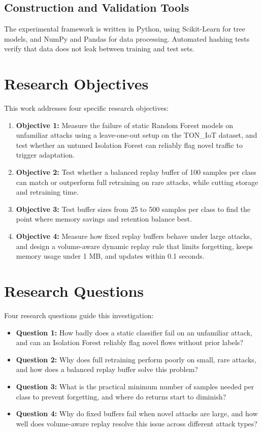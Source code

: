 \subsection{Construction and Validation Tools}
\label{subsec:construction_validation_tools}
The experimental framework is written in Python, using Scikit-Learn for tree models, and NumPy and Pandas for data processing. Automated hashing tests verify that data does not leak between training and test sets.

\section{Research Objectives}
\label{sec:research_objectives}

This work addresses four specific research objectives:

\begin{enumerate}
    \item \textbf{Objective 1:} Measure the failure of static Random Forest models on unfamiliar attacks using a leave-one-out setup on the TON\_IoT dataset, and test whether an untuned Isolation Forest can reliably flag novel traffic to trigger adaptation.
    \item \textbf{Objective 2:} Test whether a balanced replay buffer of 100 samples per class can match or outperform full retraining on rare attacks, while cutting storage and retraining time.
    \item \textbf{Objective 3:} Test buffer sizes from 25 to 500 samples per class to find the point where memory savings and retention balance best.
    \item \textbf{Objective 4:} Measure how fixed replay buffers behave under large attacks, and design a volume-aware dynamic replay rule that limits forgetting, keeps memory usage under 1 MB, and updates within 0.1 seconds.
\end{enumerate}

\section{Research Questions}
\label{sec:research_questions}

Four research questions guide this investigation:

\begin{itemize}
    \item \textbf{Question 1:} How badly does a static classifier fail on an unfamiliar attack, and can an Isolation Forest reliably flag novel flows without prior labels?
    \item \textbf{Question 2:} Why does full retraining perform poorly on small, rare attacks, and how does a balanced replay buffer solve this problem?
    \item \textbf{Question 3:} What is the practical minimum number of samples needed per class to prevent forgetting, and where do returns start to diminish?
    \item \textbf{Question 4:} Why do fixed buffers fail when novel attacks are large, and how well does volume-aware replay resolve this issue across different attack types?
\end{itemize}

